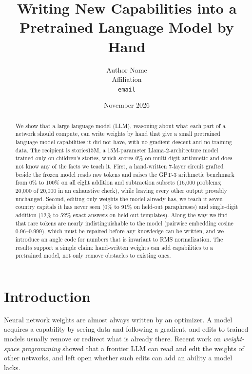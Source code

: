 \documentclass[11pt]{article}
\title{Writing New Capabilities into a Pretrained Language Model by Hand}
\author{Author Name\\ Affiliation\\ \texttt{email}}
\date{November 2026}
\begin{document}
\maketitle

\begin{abstract}
We show that a large language model (LLM), reasoning about what each part of a network should compute, can write weights by hand that give a small pretrained language model capabilities it did not have, with no gradient descent and no training data. The recipient is stories15M, a 15M-parameter Llama-2-architecture model trained only on children's stories, which scores 0\% on multi-digit arithmetic and does not know any of the facts we teach it. First, a hand-written 7-layer circuit grafted beside the frozen model reads raw tokens and raises the GPT-3 arithmetic benchmark from 0\% to 100\% on all eight addition and subtraction subsets (16{,}000 problems; 20{,}000 of 20{,}000 in an exhaustive check), while leaving every other output provably unchanged. Second, editing only weights the model already has, we teach it seven country capitals it has never seen (0\% to 91\% on held-out paraphrases) and single-digit addition (12\% to 52\% exact answers on held-out templates). Along the way we find that rare tokens are nearly indistinguishable to the model (pairwise embedding cosine 0.96--0.999), which must be repaired before any knowledge can be written, and we introduce an angle code for numbers that is invariant to RMS normalization. The results support a simple claim: hand-written weights can add capabilities to a pretrained model, not only remove obstacles to existing ones.
\end{abstract}

\section{Introduction}
Neural network weights are almost always written by an optimizer. A model acquires a capability by seeing data and following a gradient, and edits to trained models usually remove or redirect what is already there. Recent work on \emph{weight-space programming} \cite{takehi2026} showed that a frontier LLM can read and edit the weights of other networks, and left open whether such edits can add an ability a model lacks.
\end{document}
